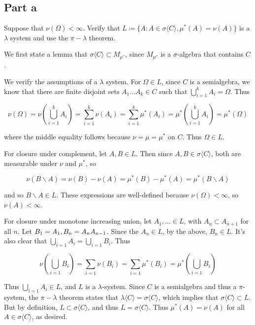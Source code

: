 \documentclass{article}
\begin{document}
\subsection*{Part a}

Suppose that $\nu(\Omega) < \infty$. Verify that $L \coloneq \{ A : A \in \sigma\langle C\rangle, \mu^*(A) = \nu(A) \}$ is a $\lambda$ system and use the $\pi-\lambda$ theorem.

We first state a lemma that $\sigma\langle C\rangle \subset M_{\mu^*}$, since $M_{\mu^*}$ is a $\sigma$-algebra that contains $C$.

We verify the assumptions of a $\lambda$ system. For $\Omega \in L$, since $C$ is a semialgebra, we know that there are finite disjoint sets $A_1 \dots A_k \in C$ such that $\bigcup_{i=1}^k A_i = \Omega$. Thus

\[
\nu(\Omega) = \nu\left( \bigcup_{i=1}^k A_i \right) = \sum_{i=1}^k \nu(A_i) = \sum_{i=1}^k \mu^*(A_i) = \mu^*\left( \bigcup_{i=1}^k A_i \right) = \mu^*(\Omega)
\]

where the middle equality follows because $\nu = \mu = \mu^*$ on $C$. Thus $\Omega \in L$.

For closure under complement, let $A, B \in L$. Then since $A, B \in \sigma\langle C\rangle$, both are measurable under $\nu$ and $\mu^*$, so

\[
\nu(B\backslash A) = \nu(B) - \nu(A) = \mu^*(B) - \mu^*(A) = \mu^*(B \backslash A)
\]

and so $B\backslash A \in L$. These expressions are well-defined because $\nu(\Omega) < \infty$, so $\nu(A) < \infty$.

For closure under monotone increasing union, let $A_1, \dots \in L$, with $A_n \subset A_{n+1}$ for all $n$. Let $B_1 = A_1, B_n = A_n \\ A_{n-1}$. Since the $A_n \in L$, by the above, $B_n \in L$. It's also clear that $\bigcup_{i=1} A_i = \bigcup_{i=1} B_i$. Thus

\[
\nu\left( \bigcup_{i=1} B_i \right) = \sum_{i=1} \nu(B_i) = \sum_{i=1} \mu^*(B_i) = \mu^*\left( \bigcup_{i=1} B_i \right)
\]

Thus $\bigcup_{i=1} A_i \in L$, and $L$ is a $\lambda$-system. Since $C$ is a semialgebra and thus a $\pi$-system, the $\pi-\lambda$ theorem states that $\lambda\langle C\rangle = \sigma\langle C\rangle$, which implies that $\sigma\langle C\rangle \subset L$. But by definition, $L \subset \sigma\langle C\rangle$, and thus $L = \sigma\langle C\rangle$. Thus $\mu^*(A) = \nu(A)$ for all $A \in \sigma\langle C\rangle$, as desired.
\end{document}
